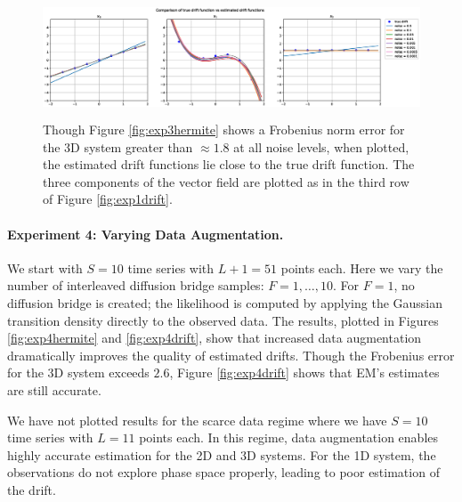\documentclass{article}
\begin{document}
\begin{figure}[th]
\begin{center}
\includegraphics[height=1.4in]{../3ddampedduffing/varying_noise/plots/drift_comparison.eps}
\end{center}
\caption{Though Figure \ref{fig:exp3hermite} shows a Frobenius norm error for the 3D system greater than $\approx 1.8$ at all noise levels, when plotted, the estimated drift functions lie close to the true drift function. The three components of the vector field are plotted as in the third row of Figure \ref{fig:exp1drift}.}
\label{fig:exp3drift}
\end{figure}

\paragraph{Experiment 4: Varying Data Augmentation.}
We start with $S = 10$ time series with $L+1 = 51$ points each.  Here we vary the number of interleaved diffusion bridge samples: $F=1, \ldots, 10$.  For $F=1$, no diffusion bridge is created; the likelihood is computed by applying the Gaussian transition density directly to the observed data.  The results, plotted in Figures \ref{fig:exp4hermite} and \ref{fig:exp4drift}, show that increased data augmentation dramatically improves the quality of estimated drifts.  Though the Frobenius error for the 3D system exceeds $2.6$, Figure \ref{fig:exp4drift} shows that EM's estimates are still accurate.

We have not plotted results for the scarce data regime where we have $S=10$ time series with $L=11$ points each.  In this regime, data augmentation enables highly accurate estimation for the 2D and 3D systems.  For the 1D system, the observations do not explore phase space properly, leading to poor estimation of the drift.
\end{document}
